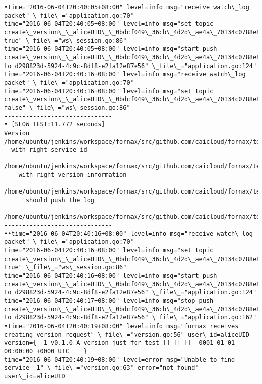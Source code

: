 \begin{lstlisting}[caption={Fornax功能性测试日志}]
•time="2016-06-04T20:40:05+08:00" level=info msg="receive watch\_log packet" \_file\_="application.go:70" 
time="2016-06-04T20:40:05+08:00" level=info msg="set topic create\_version\_\_aliceUID\_\_0bdcf049\_36cb\_4d2d\_ae4a\_70134c0788e8\_\_c9cb3341\_e9b6\_45c1\_93f2\_9f74534995a7 true" \_file\_="ws\_session.go:86" 
time="2016-06-04T20:40:05+08:00" level=info msg="start push create\_version\_\_aliceUID\_\_0bdcf049\_36cb\_4d2d\_ae4a\_70134c0788e8\_\_c9cb3341\_e9b6\_45c1\_93f2\_9f74534995a7 to d298823d-5924-4c9c-8df8-e2fa12e87e56" \_file\_="application.go:124" 
time="2016-06-04T20:40:16+08:00" level=info msg="receive watch\_log packet" \_file\_="application.go:70" 
time="2016-06-04T20:40:16+08:00" level=info msg="set topic create\_version\_\_aliceUID\_\_0bdcf049\_36cb\_4d2d\_ae4a\_70134c0788e8\_\_c9cb3341\_e9b6\_45c1\_93f2\_9f74534995a7 false" \_file\_="ws\_session.go:86" 
------------------------------
• [SLOW TEST:11.772 seconds]
Version
/home/ubuntu/jenkins/workspace/fornax/src/github.com/caicloud/fornax/tests/version/version\_test.go:374
  with right service id
  /home/ubuntu/jenkins/workspace/fornax/src/github.com/caicloud/fornax/tests/version/version\_test.go:206
    with right version information
    /home/ubuntu/jenkins/workspace/fornax/src/github.com/caicloud/fornax/tests/version/version\_test.go:197
      should push the log
      /home/ubuntu/jenkins/workspace/fornax/src/github.com/caicloud/fornax/tests/version/version\_test.go:178
------------------------------
••time="2016-06-04T20:40:16+08:00" level=info msg="receive watch\_log packet" \_file\_="application.go:70" 
time="2016-06-04T20:40:16+08:00" level=info msg="set topic create\_version\_\_aliceUID\_\_0bdcf049\_36cb\_4d2d\_ae4a\_70134c0788e8\_\_\_1 true" \_file\_="ws\_session.go:86" 
time="2016-06-04T20:40:16+08:00" level=info msg="start push create\_version\_\_aliceUID\_\_0bdcf049\_36cb\_4d2d\_ae4a\_70134c0788e8\_\_\_1 to d298823d-5924-4c9c-8df8-e2fa12e87e56" \_file\_="application.go:124" 
time="2016-06-04T20:40:17+08:00" level=info msg="stop push create\_version\_\_aliceUID\_\_0bdcf049\_36cb\_4d2d\_ae4a\_70134c0788e8\_\_c9cb3341\_e9b6\_45c1\_93f2\_9f74534995a7 to d298823d-5924-4c9c-8df8-e2fa12e87e56" \_file\_="application.go:162" 
•time="2016-06-04T20:40:19+08:00" level=info msg="fornax receives creating version request" \_file\_="version.go:56" user\_id=aliceUID version={ -1 v0.1.0 A version just for test [] [] []  0001-01-01 00:00:00 +0000 UTC    } 
time="2016-06-04T20:40:19+08:00" level=error msg="Unable to find service -1" \_file\_="version.go:63" error="not found" user\_id=aliceUID 

\end{lstlisting}
